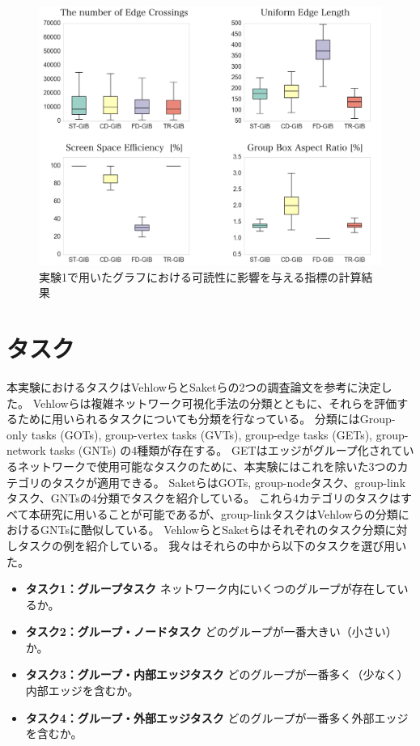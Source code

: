 \documentclass{kuee}
\begin{document}
\begin{figure}
  \centering
  \label{fig:computation_4layout}
  \includegraphics[width=15cm]{./images/4sta.png}
  \caption{実験1で用いたグラフにおける可読性に影響を与える指標の計算結果}
\end{figure}


\section{タスク}
\label{sec:task_ex1}
本実験におけるタスクはVehlowら\cite{Vehlow2017VisualizingGS}とSaketら\cite{saket2014group}の2つの調査論文を参考に決定した。
Vehlowらは複雑ネットワーク可視化手法の分類とともに、それらを評価するために用いられるタスクについても分類を行なっている。
分類にはGroup-only tasks (GOTs), group-vertex tasks (GVTs), group-edge tasks (GETs), group-network tasks (GNTs) の4種類が存在する。
GETはエッジがグループ化されているネットワークで使用可能なタスクのために、本実験にはこれを除いた3つのカテゴリのタスクが適用できる。
SaketらはGOTs, group-nodeタスク、group-linkタスク、GNTsの4分類でタスクを紹介している。
これら4カテゴリのタスクはすべて本研究に用いることが可能であるが、group-linkタスクはVehlowらの分類におけるGNTsに酷似している。
VehlowらとSaketらはそれぞれのタスク分類に対しタスクの例を紹介している。
我々はそれらの中から以下のタスクを選び用いた。
\begin{itemize}
  \item {\bf タスク1：グループタスク} ネットワーク内にいくつのグループが存在しているか。
  \item {\bf タスク2：グループ・ノードタスク} どのグループが一番大きい（小さい）か。
  \item {\bf タスク3：グループ・内部エッジタスク} どのグループが一番多く（少なく）内部エッジを含むか。
  \item {\bf タスク4：グループ・外部エッジタスク} どのグループが一番多く外部エッジを含むか。
\end{itemize}
\end{document}
